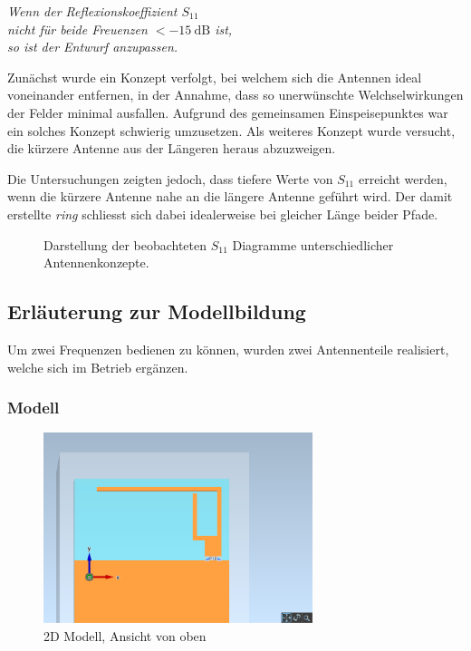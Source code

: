 \begin{center}
	\emph{
		Wenn der Reflexionskoeffizient $S_{11}$ \\
		nicht für beide Freuenzen $< \SI{-15}{\dB}$ ist, \\
		so ist der Entwurf anzupassen.}
\end{center}

Zunächst wurde ein Konzept verfolgt, bei welchem sich die Antennen
ideal voneinander entfernen, in der Annahme, dass so unerwünschte
Welchselwirkungen der Felder minimal ausfallen. Aufgrund des gemeinsamen
Einspeisepunktes war ein solches Konzept schwierig umzusetzen. Als weiteres
Konzept wurde versucht, die kürzere Antenne aus der Längeren heraus
abzuzweigen.

Die Untersuchungen zeigten jedoch, dass tiefere Werte von $S_{11}$
erreicht werden, wenn die kürzere Antenne nahe an die längere Antenne
geführt wird. Der damit erstellte \emph{ring} schliesst sich dabei
idealerweise bei gleicher Länge beider Pfade.

\begin{figure}[h!]
	\centering
	\footnotesize
	\def\svgscale{0.75}
	
	\caption{Darstellung der beobachteten $S_{11}$ Diagramme unterschiedlicher Antennenkonzepte.}
	\label{fig:antenna_concept_1}
\end{figure}


\subsection{Erläuterung zur Modellbildung}
Um zwei Frequenzen bedienen zu können, wurden zwei Antennenteile realisiert, welche sich im Betrieb ergänzen.

\subsubsection{Modell}

\begin{figure}[h!]
	\centering
	\includegraphics[width=0.7\textwidth]{../fig/plt/crazy_stuff_l4_pcb_v2c_laptop_1a_105_5ghz_3d_pcb_xy.png}
	\caption{2D Modell, Ansicht von oben}
\end{figure}


